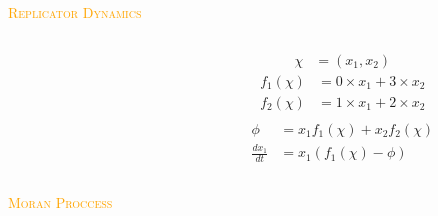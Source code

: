 \documentclass{beamer}
\begin{document}
\begin{frame}
    \begin{center}
    \vspace{-1cm}

    
    \end{center}
\end{frame}

\begin{frame}
    \begin{center}
        \Large
        \textcolor{orange}{\textsc{Replicator Dynamics}}
    \end{center}
\end{frame}

\begin{frame}
    \begin{columns}
        \begin{column}{.5\textwidth}
            
        \end{column}
        \begin{column}{.5\textwidth}
            \begin{align*}
                \chi & = (x_1, x_2)
            \end{align*}
            \begin{align*}
                f_1(\chi) & = 0 \times x_1 + 3 \times x_2 \\
                f_2(\chi) & = 1 \times x_1 + 2 \times x_2 \\
            \end{align*}
            \begin{align*}
                \phi & = x_1 f_1(\chi) + x_2 f_2(\chi) \\
                \frac{dx_1}{dt} & = x_1(f_1(\chi) - \phi) 
        \end{align*}
        \end{column}
    \end{columns}
\end{frame}

\begin{frame}
    \begin{center}
    
    \end{center}
\end{frame}

\begin{frame}
    \begin{center}
        \Large
        \textcolor{orange}{\textsc{Moran Proccess}} \\ \vspace{3pt}
    \end{center}
\end{frame}
\end{document}
